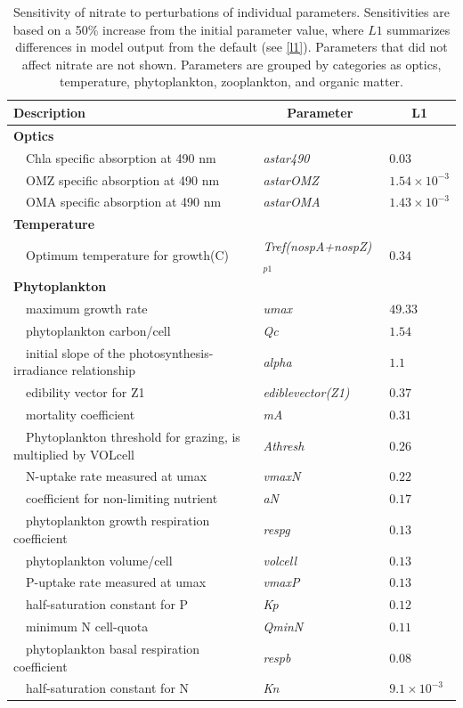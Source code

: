 \documentclass[letterpaper,12pt,oneside]{article}\usepackage[]{graphicx}\usepackage[]{color}
\begin{document}
\begin{table}[!tbp]
{\footnotesize
\caption{Sensitivity of nitrate to perturbations of individual parameters.  Sensitivities are based on a 50\% increase from the initial parameter value, where $L1$ summarizes differences in model output from the default (see \cref{l1}).  Parameters that did not affect nitrate are not shown.  Parameters are grouped by categories as optics, temperature, phytoplankton, zooplankton, and organic matter.\label{tab:no3sens}} 
\begin{center}
\begin{tabular}{lll}
\hline\hline
\multicolumn{1}{l}{Description}&\multicolumn{1}{c}{Parameter}&\multicolumn{1}{c}{L1}\tabularnewline
\hline
{\bfseries Optics}&&\tabularnewline
~~Chla specific absorption at 490 nm&\textit{astar490}&$0.03$\tabularnewline
~~OMZ specific absorption at 490 nm&\textit{astarOMZ}&$1.54\times 10^{-3}$\tabularnewline
~~OMA specific absorption at 490 nm&\textit{astarOMA}&$1.43\times 10^{-3}$\tabularnewline
\hline
{\bfseries Temperature}&&\tabularnewline
~~Optimum temperature for growth(C)&\textit{Tref(nospA+nospZ)$_{p1}$}&$0.34$\tabularnewline
\hline
{\bfseries Phytoplankton}&&\tabularnewline
~~maximum growth rate&\textit{umax}&$49.33$\tabularnewline
~~phytoplankton carbon/cell&\textit{Qc}&$1.54$\tabularnewline
~~initial slope of the photosynthesis-irradiance relationship&\textit{alpha}&$1.1$\tabularnewline
~~edibility vector for Z1&\textit{ediblevector(Z1)}&$0.37$\tabularnewline
~~mortality coefficient&\textit{mA}&$0.31$\tabularnewline
~~Phytoplankton threshold for grazing, is multiplied by VOLcell&\textit{Athresh}&$0.26$\tabularnewline
~~N-uptake rate measured at umax&\textit{vmaxN}&$0.22$\tabularnewline
~~coefficient for non-limiting nutrient&\textit{aN}&$0.17$\tabularnewline
~~phytoplankton growth respiration coefficient&\textit{respg}&$0.13$\tabularnewline
~~phytoplankton volume/cell&\textit{volcell}&$0.13$\tabularnewline
~~P-uptake rate measured at umax&\textit{vmaxP}&$0.13$\tabularnewline
~~half-saturation constant for P&\textit{Kp}&$0.12$\tabularnewline
~~minimum N cell-quota&\textit{QminN}&$0.11$\tabularnewline
~~phytoplankton basal respiration coefficient&\textit{respb}&$0.08$\tabularnewline
~~half-saturation constant for N&\textit{Kn}&$9.1\times 10^{-3}$\tabularnewline

\end{tabular}
\end{center}}
\end{table}
\end{document}
